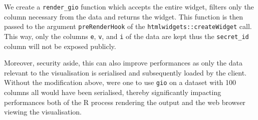 \documentclass[
]{krantz}
\makeatletter
\newenvironment{Shaded}{\begin{snugshade}}{\end{snugshade}}
\newcommand{\CommentTok}[1]{\textcolor[rgb]{0.37,0.37,0.37}{\textit{#1}}}
\newcommand{\ControlFlowTok}[1]{\textcolor[rgb]{0.27,0.27,0.27}{\textbf{#1}}}
\newcommand{\DataTypeTok}[1]{\textcolor[rgb]{0.27,0.27,0.27}{#1}}
\newcommand{\DecValTok}[1]{\textcolor[rgb]{0.06,0.06,0.06}{#1}}
\newcommand{\KeywordTok}[1]{\textcolor[rgb]{0.27,0.27,0.27}{\textbf{#1}}}
\newcommand{\NormalTok}[1]{#1}
\newcommand{\OperatorTok}[1]{\textcolor[rgb]{0.43,0.43,0.43}{\textbf{#1}}}
\newcommand{\OtherTok}[1]{\textcolor[rgb]{0.37,0.37,0.37}{#1}}
\newcommand{\StringTok}[1]{\textcolor[rgb]{0.5,0.5,0.5}{#1}}
\newenvironment{kframe}{%
\medskip{}
\setlength{\fboxsep}{.8em}
 \def\at@end@of@kframe{}%
 \ifinner\ifhmode%
  \def\at@end@of@kframe{\end{minipage}}%
  \begin{minipage}{\columnwidth}%
 \fi\fi%
 \def\FrameCommand##1{\hskip\@totalleftmargin \hskip-\fboxsep
 \colorbox{shadecolor}{##1}\hskip-\fboxsep
     \hskip-\linewidth \hskip-\@totalleftmargin \hskip\columnwidth}%
 \MakeFramed {\advance\hsize-\width
   \@totalleftmargin\z@ \linewidth\hsize
   \@setminipage}}%
 {\par\unskip\endMakeFramed%
 \at@end@of@kframe}
\renewenvironment{Shaded}{\begin{kframe}}{\end{kframe}}
\makeatother
\begin{document}
\begin{Shaded}
\end{Shaded}

We create a \texttt{render\_gio} function which accepts the entire widget, filters only the column necessary from the data and returns the widget. This function is then passed to the argument \texttt{preRenderHook} of the \texttt{htmlwidgets::createWidget} call. This way, only the columns \texttt{e}, \texttt{v}, and \texttt{i} of the data are kept thus the \texttt{secret\_id} column will not be exposed publicly.

\begin{Shaded}
\end{Shaded}

Moreover, security aside, this can also improve performances as only the data relevant to the visualisation is serialised and subsequently loaded by the client. Without the modification above, were one to use \texttt{gio} on a dataset with 100 columns all would have been serialised, thereby significantly impacting performances both of the R process rendering the output and the web browser viewing the visualisation.
\end{document}
